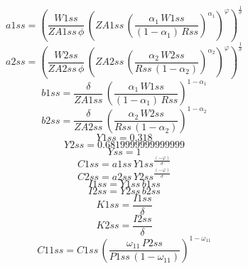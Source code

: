 \begin{dmath*}
a1ss = \left(\frac{{W1ss}}{{ZA1ss}\, {{\phi}}}\, \left({ZA1ss}\, \left(\frac{{{\alpha_{1}}}\, {W1ss}}{\left(1-{{\alpha_{1}}}\right)\, {Rss}}\right)^{{{\alpha_{1}}}}\right)^{{{\varphi}}}\right)^{\frac{1}{{{\sigma}}}}
\end{dmath*}
\begin{dmath*}
a2ss = \left(\frac{{W2ss}}{{ZA2ss}\, {{\phi}}}\, \left({ZA2ss}\, \left(\frac{{{\alpha_{2}}}\, {W2ss}}{{Rss}\, \left(1-{{\alpha_{2}}}\right)}\right)^{{{\alpha_{2}}}}\right)^{{{\varphi}}}\right)^{\frac{1}{{{\sigma}}}}
\end{dmath*}
\begin{dmath*}
b1ss = \frac{{{\delta}}}{{ZA1ss}}\, \left(\frac{{{\alpha_{1}}}\, {W1ss}}{\left(1-{{\alpha_{1}}}\right)\, {Rss}}\right)^{1-{{\alpha_{1}}}}
\end{dmath*}
\begin{dmath*}
b2ss = \frac{{{\delta}}}{{ZA2ss}}\, \left(\frac{{{\alpha_{2}}}\, {W2ss}}{{Rss}\, \left(1-{{\alpha_{2}}}\right)}\right)^{1-{{\alpha_{2}}}}
\end{dmath*}
\begin{dmath*}
Y1ss = 0.318
\end{dmath*}
\begin{dmath*}
Y2ss = 0.6819999999999999
\end{dmath*}
\begin{dmath*}
Yss = 1
\end{dmath*}
\begin{dmath*}
C1ss = {a1ss}\, {Y1ss}^{\frac{\left(-{{\varphi}}\right)}{{{\sigma}}}}
\end{dmath*}
\begin{dmath*}
C2ss = {a2ss}\, {Y2ss}^{\frac{\left(-{{\varphi}}\right)}{{{\sigma}}}}
\end{dmath*}
\begin{dmath*}
I1ss = {Y1ss}\, {b1ss}
\end{dmath*}
\begin{dmath*}
I2ss = {Y2ss}\, {b2ss}
\end{dmath*}
\begin{dmath*}
K1ss = \frac{{I1ss}}{{{\delta}}}
\end{dmath*}
\begin{dmath*}
K2ss = \frac{{I2ss}}{{{\delta}}}
\end{dmath*}
\begin{dmath*}
C11ss = {C1ss}\, \left(\frac{{{\omega_{11}}}\, {P2ss}}{{P1ss}\, \left(1-{{\omega_{11}}}\right)}\right)^{1-{{\omega_{11}}}}
\end{dmath*}
